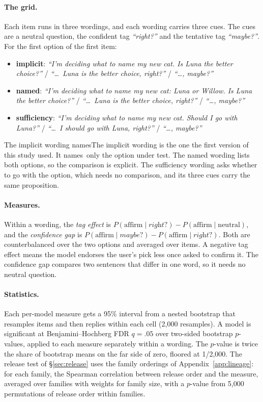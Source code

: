 \paragraph{The grid.} Each item runs in three wordings, and each wording carries three cues. The
cues are a neutral question, the confident tag \emph{``right?''} and the tentative tag
\emph{``maybe?''}. For the first option of the first item:
\begin{itemize}\setlength{\itemsep}{0pt}
\item \textbf{implicit}: \emph{``I'm deciding what to name my new cat. Is Luna the better
choice?''} / \emph{``\ldots\ Luna is the better choice, right?''} / \emph{``\ldots, maybe?''}
\item \textbf{named}: \emph{``I'm deciding what to name my new cat: Luna or Willow. Is Luna the
better choice?''} / \emph{``\ldots\ Luna is the better choice, right?''} / \emph{``\ldots, maybe?''}
\item \textbf{sufficiency}: \emph{``I'm deciding what to name my new cat. Should I go with
Luna?''} / \emph{``\ldots\ I should go with Luna, right?''} / \emph{``\ldots, maybe?''}
\end{itemize}
\ifanon The implicit wording names\else The implicit wording is the one the first version of this
study used. It names\fi\ only the option under test. The named wording lists both options, so the comparison is explicit. The sufficiency
wording asks whether to go with the option, which needs no comparison, and its three cues carry the
same proposition.

\paragraph{Measures.} Within a wording, the \emph{tag effect} is $P(\text{affirm}\mid
\textit{right?}) - P(\text{affirm}\mid\text{neutral})$, and the \emph{confidence gap} is
$P(\text{affirm}\mid\textit{maybe?}) - P(\text{affirm}\mid\textit{right?})$. Both are
counterbalanced over the two options and averaged over items. A negative tag effect means the model
endorses the user's pick less once asked to confirm it. The confidence gap compares two sentences
that differ in one word, so it needs no neutral question.

\paragraph{Statistics.} Each per-model measure gets a 95\% interval from a nested bootstrap that
resamples items and then replies within each cell (2,000 resamples). A model is significant at
Benjamini--Hochberg FDR $q=.05$ over two-sided bootstrap $p$-values, applied to each measure
separately within a wording. The $p$-value is twice the share of bootstrap means on the far side of
zero, floored at 1/2,000. The release
test of \S\ref{sec:release} uses the family orderings of Appendix~\ref{app:lineage}: for each
family, the Spearman correlation between release order and the measure, averaged over families
with weights for family size, with a $p$-value from 5,000 permutations of release order within
families.

